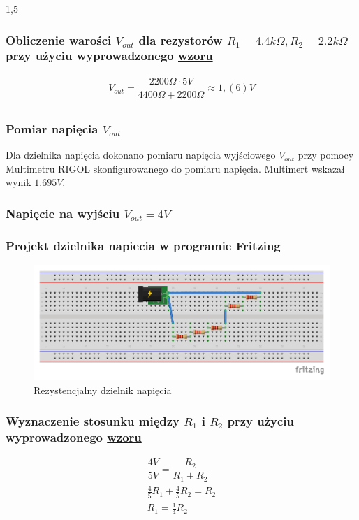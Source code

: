 \documentclass[polish,polish,a4paper]{article}
\begin{document}
\begin{spacing}{1,5}
		\subsubsection*{Obliczenie warości $ V_{out}$ dla rezystorów $ R_{1} = 4.4k\Omega, R_{2} =2.2k\Omega  $  przy użyciu wyprowadzonego \hyperref[eq:vout]{wzoru}}
		\begin{gather*}
		V_{out} = \dfrac{2200\Omega \cdot 5V}{4400\Omega + 2200\Omega} \approx 1,(6) V\\
		\end{gather*}
		\subsubsection*{Pomiar napięcia $ V_{out} $}
		Dla dzielnika napięcia dokonano pomiaru napięcia wyjściowego $ V_{out} $ przy pomocy Multimetru RIGOL skonfigurowanego do pomiaru napięcia. Multimert wskazał wynik $1.695V$.
		
		
		
		
		\subsubsection{Napięcie na wyjściu $V_{out} =  4V $}
		
		\subsubsection*{Projekt dzielnika napiecia w programie Fritzing}
		
		\begin{figure}[H]
			\centering
			\includegraphics[scale=0.9]{4_bb.pdf}
			\caption{Rezystencjalny dzielnik napięcia}
			\label{fig:pod4}
		\end{figure}
		
		\subsubsection*{Wyznaczenie stosunku między $ R_{1} $ i $ R_{2} $ przy użyciu wyprowadzonego \hyperref[eq:vout]{wzoru}}
		\begin{gather*}
		\dfrac{4V}{5V} = \dfrac{R_{2}}{R_{1} + R_{2}}\\
		\frac{4}{5} R_{1} + \frac{4}{5}R_{2} = R_{2}\\
		R_{1} =\frac{1}{4} R_{2}\\
		\end{gather*}

\end{spacing}
\end{document}
